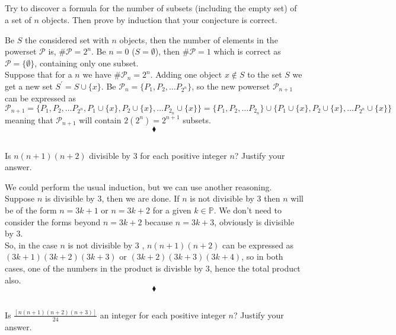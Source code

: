 \subsection{}
\begin{tcolorbox}
Try to discover a formula for the number of subsets (including the empty set) of a set of $n$ objects. Then prove by induction that your conjecture is correct. 
\end{tcolorbox}
$$ $$
Be $S$ the considered set with $n$ objects, then the number of elements in the powerset $\mathscr{P}$ is,  $\#\mathscr{P}=2^n$.
Be $n=0$ ($S=\emptyset$), then $\#\mathscr{P}=1$ which is correct as $\mathscr{P}=\{\emptyset\}$, containing only one subset.\\
Suppose that for a $n$ we have $\#\mathscr{P}_n=2^n$. Adding one object $x\not\in S $ to the set $S$ we get a new set $S^{'} = S\cup \{x\}$. Be $\mathscr{P}_n=\{P_1, P_2,\dots P_{2^n}\}$, so the new powerset $\mathscr{P}_{n+1}$ can be expressed as 
$\mathscr{P}_{n+1}=\{P_1, P_2,\dots P_{2^n},P_1\cup \{x\}, P_2\cup \{x\},\dots P_{2_n}\cup \{x\}\}=\{P_1, P_2,\dots P_{2_n}\}\cup \{P_1\cup \{x\}, P_2\cup \{x\},\dots P_{2^n}\cup \{x\}\} $
meaning that $\mathscr{P}_{n+1}$ will contain $2(2^{n})=2^{n+1} $ subsets. 
$$\blacklozenge$$
\subsection{}
\begin{tcolorbox}
Is $n(n + 1)(n + 2)$ divisible by $3$ for each positive integer $n$? Justify your answer. 
\end{tcolorbox}
$$ $$
We could perform the usual induction, but we can use another reasoning. \\
Suppose $n$ is divisible by $3$, then we are done. If $n$ is not divisible by $3$ then $n$ will be of the form $n=3k+1$ or  $n=3k+2$ for a given $k\in \mathbb{P}$. We don't need to consider the forms beyond $n=3k+2$ because $n=3k+3$, obviously is divisible by $3$.\\
So, in the case $n$ is not divisible by $3$ , $n(n + 1)(n + 2)$ can be expressed as $(3k+1)(3k+2)(3k+3)$ or $(3k+2)(3k+3)(3k+4)$, so in  both cases, one of the numbers in the product is divisble by $3$, hence the total product also.
$$\blacklozenge$$
\subsection{}
\begin{tcolorbox}
 Is $\frac{\left[n(n + 1)(n + 2)(n + 3)\right]}{24}$ an integer for each positive integer $n$? Justify your answer. 
\end{tcolorbox}
$$ $$


